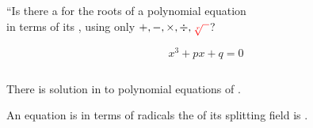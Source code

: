 \begin{frame}{}
  \begin{center}
    ``Is there a  for the roots of a 
    polynomial equation \\[8pt]
    in terms of its ,
    using only $+, -, \times, \div, \textcolor{red}{\sqrt[r]{\;\;}}$?
  \end{center}
\end{frame}

\begin{frame}{}
  \[
    x^3 + px + q = 0
  \]

  \begin{columns}
      \begin{center}
      \end{center}
  \end{columns}
\end{frame}

\begin{frame}{}
\end{frame}

\begin{frame}{}
  \begin{theorem}
    There is  solution in  to
    polynomial equations of .
  \end{theorem}

  \pause
  \vspace{0.30cm}
  \begin{center}
  \end{center}
\end{frame}

\begin{frame}
  \begin{theorem}
    An equation is  in terms of radicals 
    the  of its splitting field is .
  \end{theorem}
\end{frame}


